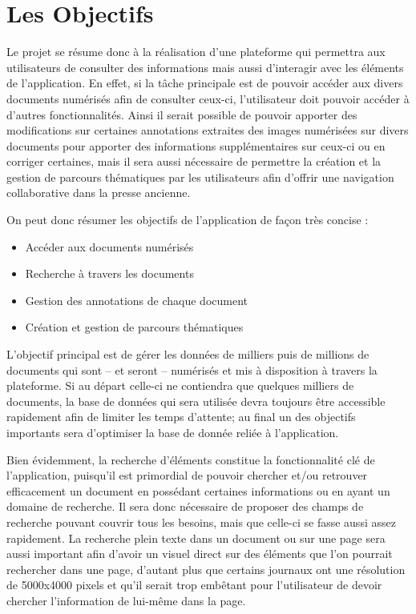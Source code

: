 \section{Les Objectifs}
	\label{sec:objectifs}

    Le projet se résume donc à la réalisation d’une plateforme qui permettra aux utilisateurs
    de consulter des informations mais aussi d’interagir avec les éléments de l’application.
    En effet, si la tâche principale est de pouvoir accéder aux divers documents numérisés afin
    de consulter ceux-ci, l’utilisateur doit pouvoir accéder à d’autres fonctionnalités.
    Ainsi il serait possible de pouvoir apporter des modifications sur certaines annotations
    extraites des images numérisées sur divers documents pour apporter des informations
    supplémentaires sur ceux-ci ou en corriger certaines, mais il sera aussi nécessaire
    de permettre la création et la gestion de parcours thématiques par les utilisateurs
    afin d’offrir une navigation collaborative dans la presse ancienne.

    On peut donc résumer les objectifs de l’application de façon très concise :

    \begin{itemize}
        \item{Accéder aux documents numérisés}
        \item{Recherche à travers les documents}
        \item{Gestion des annotations de chaque document}
        \item{Création et gestion de parcours thématiques}
    \end{itemize}

    L’objectif principal est de gérer les données de milliers puis de millions de documents
    qui sont – et seront – numérisés et mis à disposition à travers la plateforme.
    Si au départ celle-ci ne contiendra que quelques milliers de documents, la base de données
    qui sera utilisée devra toujours être accessible rapidement afin de limiter les temps d’attente;
    au final un des objectifs importants sera d’optimiser la base de donnée reliée à l’application.

    Bien évidemment, la recherche d’éléments constitue la fonctionnalité clé de l’application,
    puisqu’il est primordial de pouvoir chercher et/ou retrouver efficacement un document
    en possédant certaines informations ou en ayant un domaine de recherche. Il sera donc nécessaire
    de proposer des champs de recherche pouvant couvrir tous les besoins, mais que celle-ci
    se fasse aussi assez rapidement. La recherche plein texte dans un document ou sur une page
    sera aussi important afin d’avoir un visuel direct sur des éléments que l’on pourrait rechercher
    dans une page, d’autant plus que certains journaux ont une résolution de 5000x4000 pixels et
    qu’il serait trop embêtant pour l’utilisateur de devoir chercher l’information de lui-même dans la page.

